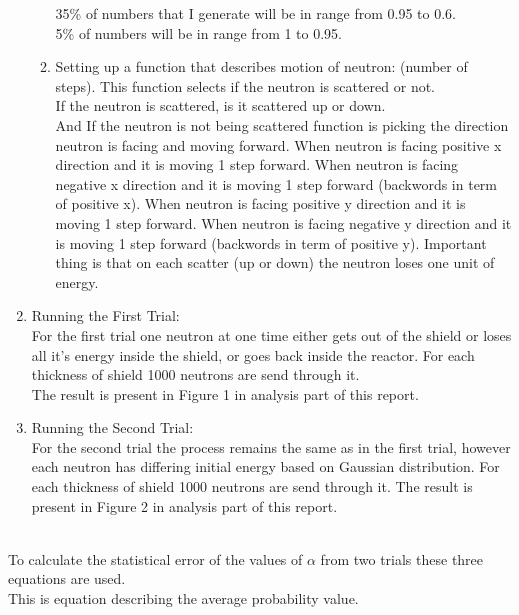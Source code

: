 \documentclass[12pt]{article}
\begin{document}
\begin{enumerate}
\begin{enumerate}
35\% of numbers that I generate will be in range from 0.95 to 0.6.\\
5\% of numbers will be in range from 1 to 0.95.
    \item Setting up a function that describes motion of neutron: (number of steps). This function selects if the neutron is scattered or not. \\
    If the neutron is scattered, is it scattered up or down.\\
    And If the neutron is not being scattered function is picking the direction neutron is facing and moving forward. When neutron is facing positive x direction and it is moving 1 step forward. When neutron is facing negative x direction and it is moving 1 step forward (backwords in term of positive x).
    When neutron is facing positive y direction and it is moving 1 step forward. When neutron is facing negative y direction and it is moving 1 step forward (backwords in term of positive y). Important thing is that on each scatter (up or down) the neutron loses one unit of energy.

\end{enumerate}

\item Running the First Trial:\\
For the first trial one neutron at one time either gets out of the shield or loses all it's energy inside the shield, or goes back inside the reactor.
For each thickness of shield 1000 neutrons are send through it. \\
The result is present in Figure 1 in analysis part of this report.

\item Running the Second Trial:\\
For the second trial the process remains the same as in the first trial, however each neutron has differing initial energy based on Gaussian distribution. For each thickness of shield 1000 neutrons are send through it.
The result is present in Figure 2 in analysis part of this report.


    
\end{enumerate}

\clearpage
{} \\

To calculate the statistical error of the values of $\alpha$ from two trials these three equations are used.\\
This is equation describing the average probability value.
\end{document}
